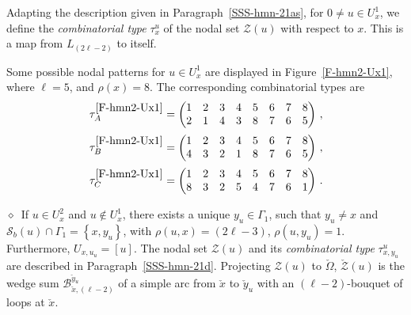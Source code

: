 \documentclass[12pt,a4paper]{amsart}
\theoremstyle{plain} %
\theoremstyle{definition}
\numberwithin{equation}{section}
\numberwithin{figure}{section}
\numberwithin{table}{section}
\newcommand{\cB}{\mathcal{B}}
\newcommand{\cS}{\mathcal{S}}
\newcommand{\cZ}{\mathcal{Z}}
\newcommand{\set}[1]{\left\lbrace #1 \right\rbrace}
\newcommand{\noid}{\noindent $\diamond$~}
\begin{document}
{Adapting the description given in Paragraph~\ref{SSS-hmn-21as},  for $0 \neq u \in U_x^1$, we define the \emph{combinatorial type} $\tau_{x}^{u}$ of the nodal set $\cZ(u)$ with respect to $x$.   This is a map from $L_{(2\ell - 2)}$ to itself.
\smallskip

Some possible nodal patterns  for $u \in U_x^1$ are displayed in Figure~\ref{F-hmn2-Ux1},  where $\ell = 5$, and $\rho(x) = 8$.  The corresponding combinatorial types  are
%
\begin{equation*}
\begin{array}{l}
 \tau^{\ref{F-hmn2-Ux1}}_A  = \begin{pmatrix}
                          1 & 2 & 3 & 4 & 5 & 6 & 7 & 8\\
                          2 & 1 & 4 & 3 & 8 & 7 & 6 & 5\\
                        \end{pmatrix}\,,\\[12pt]
\tau^{\ref{F-hmn2-Ux1}}_B = \begin{pmatrix}
                          1 & 2 & 3 & 4 & 5 & 6 & 7 & 8\\
                          4 & 3 & 2 & 1 & 8 & 7 & 6 & 5 \\
                        \end{pmatrix}\,,\\[12pt]
\tau^{\ref{F-hmn2-Ux1}}_C = \begin{pmatrix}
                          1 & 2 & 3 & 4 & 5 & 6 & 7 & 8\\
                          8 & 3 & 2 & 5 & 4 & 7 & 6 & 1 \\
                        \end{pmatrix}\,.
\end{array}%
\end{equation*}

\noid  If $u \in U^2_x$ and $u \not \in U^1_x$, there exists a unique $y_u \in \Gamma_1$, such that $y_u \neq x$ and $\cS_b(u) \cap \Gamma_1 = \set{x,y_u}$, with $\rho(u,x) = (2\ell - 3)$, $\rho(u,y_u)=1$. Furthermore, $U_{x,u_u}=[u]$. The nodal set $\cZ(u)$  and its \emph{combinatorial type} $\tau_{x,y_u}^{u}$  are described in Paragraph~\ref{SSS-hmn-21d}. Projecting  $\cZ(u)$ to $\check{\Omega}$, $\check{\cZ}(u)$ is the wedge sum $\cB^{\check{y}_u}_{\check{x},(\ell -2)}$ of a simple arc from $\check{x}$ to $\check{y}_u$ with an $(\ell-2)$-bouquet of loops at $\check{x}$.





}
\end{document}
